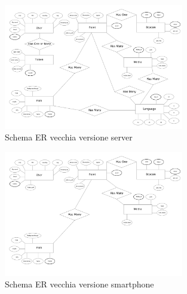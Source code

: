 \begin{figure}[h]
\centering
\includegraphics[width=0.7\textwidth]{images/erOld.png}
\caption{Schema ER vecchia versione server}
\end{figure}

\begin{figure}[h]
\centering
\includegraphics[width=0.7\textwidth]{images/erOldSpartphone.png}
\caption{Schema ER vecchia versione smartphone}
\end{figure}
\vspace{5mm}






